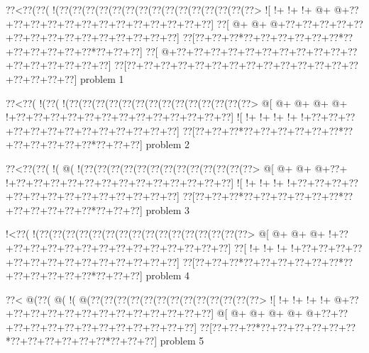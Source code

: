 \vbox{\vbox{\goo
\0??<\0??(\0??(\- !(\0??(\0??(\0??(\0??(\0??(\0??(\0??(\0??(\0??(\0??(\0??(\0??(\0??(\0??(\0??>
\- ![\- !+\- !+\- !+\- @+\- @+\0??+\0??+\0??+\0??+\0??+\0??+\0??+\0??+\0??+\0??+\0??+\0??+\0??]
\0??[\- @+\- @+\- @+\0??+\0??+\0??+\0??+\0??+\0??+\0??+\0??+\0??+\0??+\0??+\0??+\0??+\0??+\0??]
\0??[\0??+\0??+\0??*\0??+\0??+\0??+\0??+\0??+\0??*\0??+\0??+\0??+\0??+\0??+\0??*\0??+\0??+\0??]
\0??[\- @+\0??+\0??+\0??+\0??+\0??+\0??+\0??+\0??+\0??+\0??+\0??+\0??+\0??+\0??+\0??+\0??+\0??]
\0??[\0??+\0??+\0??+\0??+\0??+\0??+\0??+\0??+\0??+\0??+\0??+\0??+\0??+\0??+\0??+\0??+\0??+\0??]
}
\hfil problem 1\hfil\break
}



\vbox{\vbox{\goo
\0??<\0??(\- !(\0??(\- !(\0??(\0??(\0??(\0??(\0??(\0??(\0??(\0??(\0??(\0??(\0??(\0??(\0??(\0??>
\- @[\- @+\- @+\- @+\- @+\- !+\0??+\0??+\0??+\0??+\0??+\0??+\0??+\0??+\0??+\0??+\0??+\0??+\0??]
\- ![\- !+\- !+\- !+\- !+\- !+\0??+\0??+\0??+\0??+\0??+\0??+\0??+\0??+\0??+\0??+\0??+\0??+\0??]
\0??[\0??+\0??+\0??*\0??+\0??+\0??+\0??+\0??+\0??*\0??+\0??+\0??+\0??+\0??+\0??*\0??+\0??+\0??]
}
\hfil problem 2\hfil\break
}



\vbox{\vbox{\goo
\0??<\0??(\0??(\- !(\- @(\- !(\0??(\0??(\0??(\0??(\0??(\0??(\0??(\0??(\0??(\0??(\0??(\0??(\0??>
\- @[\- @+\- @+\- @+\0??+\- !+\0??+\0??+\0??+\0??+\0??+\0??+\0??+\0??+\0??+\0??+\0??+\0??+\0??]
\- ![\- !+\- !+\- !+\- !+\0??+\0??+\0??+\0??+\0??+\0??+\0??+\0??+\0??+\0??+\0??+\0??+\0??+\0??]
\0??[\0??+\0??+\0??*\0??+\0??+\0??+\0??+\0??+\0??*\0??+\0??+\0??+\0??+\0??+\0??*\0??+\0??+\0??]
}
\hfil problem 3\hfil\break
}



\vbox{\vbox{\goo
\- !<\0??(\- !(\0??(\0??(\0??(\0??(\0??(\0??(\0??(\0??(\0??(\0??(\0??(\0??(\0??(\0??(\0??(\0??>
\- @[\- @+\- @+\- @+\- !+\0??+\0??+\0??+\0??+\0??+\0??+\0??+\0??+\0??+\0??+\0??+\0??+\0??+\0??]
\0??[\- !+\- !+\- !+\- !+\0??+\0??+\0??+\0??+\0??+\0??+\0??+\0??+\0??+\0??+\0??+\0??+\0??+\0??]
\0??[\0??+\0??+\0??*\0??+\0??+\0??+\0??+\0??+\0??*\0??+\0??+\0??+\0??+\0??+\0??*\0??+\0??+\0??]
}
\hfil problem 4\hfil\break
}



\vbox{\vbox{\goo
\0??<\- @(\0??(\- @(\- !(\- @(\0??(\0??(\0??(\0??(\0??(\0??(\0??(\0??(\0??(\0??(\0??(\0??(\0??>
\- ![\- !+\- !+\- !+\- !+\- @+\0??+\0??+\0??+\0??+\0??+\0??+\0??+\0??+\0??+\0??+\0??+\0??+\0??]
\- @[\- @+\- @+\- @+\- @+\- @+\0??+\0??+\0??+\0??+\0??+\0??+\0??+\0??+\0??+\0??+\0??+\0??+\0??]
\0??[\0??+\0??+\0??*\0??+\0??+\0??+\0??+\0??+\0??*\0??+\0??+\0??+\0??+\0??+\0??*\0??+\0??+\0??]
}
\hfil problem 5\hfil\break
}



